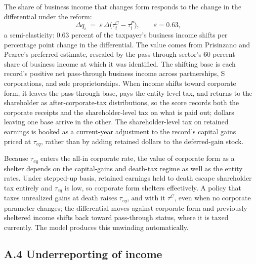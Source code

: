 \documentclass[10pt,twocolumn]{article}
\begin{document}
The share of business income that changes form responds to the change in the
differential under the reform:
\begin{equation*}
\Delta q_i \;=\; \varepsilon\,\Delta\big(\tau^{C}_i - \tau^{P}_i\big), \qquad \varepsilon = 0.63,
\end{equation*}
a semi-elasticity: 0.63 percent of the taxpayer's business income shifts per
percentage point change in the differential. The value comes from
Prisinzano and Pearce's preferred estimate, rescaled by the pass-through sector's 60
percent share of business income at which it was identified. The shifting base
is each record's positive net pass-through business income across
partnerships, S corporations, and sole proprietorships. When income shifts
toward corporate form, it leaves the pass-through base, pays the entity-level
tax, and returns to the shareholder as after-corporate-tax distributions, so
the score records both the corporate receipts and the shareholder-level tax on
what is paid out; dollars leaving one base arrive in the other. The
shareholder-level tax on retained earnings is booked as a current-year
adjustment to the record's capital gains priced at $\tau_{eq}$, rather than
by adding retained dollars to the deferred-gain stock.

Because $\tau_{eq}$ enters the all-in corporate rate, the value of corporate form as a shelter depends on the capital-gains and
death-tax regime as well as the entity rates. Under stepped-up basis, retained earnings held to death
escape shareholder tax entirely and $\tau_{eq}$ is low, so corporate form
shelters effectively. A policy that taxes unrealized gains at death raises
$\tau_{eq}$, and with it $\tau^{C}$, even when no corporate parameter changes;
the differential moves against corporate form and previously sheltered income
shifts back toward pass-through status, where it is taxed currently. The model
produces this unwinding automatically.

\subsection*{A.4 Underreporting of income}
\end{document}
